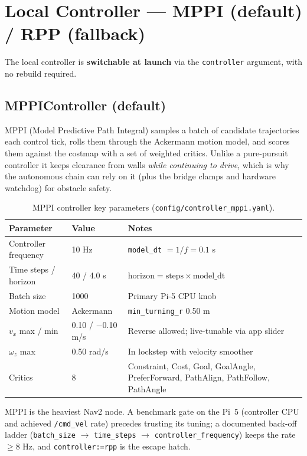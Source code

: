 \documentclass[12pt,a4paper]{report}
\begin{document}
\section{Local Controller --- MPPI (default) / RPP (fallback)}

The local controller is \textbf{switchable at launch} via the \texttt{controller}
argument, with no rebuild required.

\subsection{MPPIController (default)}

MPPI (Model Predictive Path Integral) samples a batch of candidate trajectories
each control tick, rolls them through the Ackermann motion model, and scores them
against the costmap with a set of weighted critics. Unlike a pure-pursuit
controller it keeps clearance from walls \emph{while continuing to drive}, which
is why the autonomous chain can rely on it (plus the bridge clamps and hardware
watchdog) for obstacle safety.

\begin{table}[H]
\centering
\caption{MPPI controller key parameters (\texttt{config/controller\_mppi.yaml}).}
\label{tab:mppi}
\begin{tabularx}{\textwidth}{|p{5.2cm}|p{2.6cm}|X|}
\hline
\textbf{Parameter} & \textbf{Value} & \textbf{Notes} \\
\hline
Controller frequency & 10 Hz & \texttt{model\_dt} $= 1/f = 0.1$ s \\
\hline
Time steps / horizon & 40 / 4.0 s & $\text{horizon} = \text{steps}\times\text{model\_dt}$ \\
\hline
Batch size & 1000 & Primary Pi-5 CPU knob \\
\hline
Motion model & Ackermann & \texttt{min\_turning\_r} 0.50 m \\
\hline
$v_x$ max / min & 0.10 / $-$0.10 m/s & Reverse allowed; live-tunable via app slider \\
\hline
$\omega_z$ max & 0.50 rad/s & In lockstep with velocity smoother \\
\hline
Critics & 8 & Constraint, Cost, Goal, GoalAngle, PreferForward, PathAlign, PathFollow, PathAngle \\
\hline
\end{tabularx}
\end{table}

MPPI is the heaviest Nav2 node. A benchmark gate on the Pi~5 (controller CPU and
achieved \texttt{/cmd\_vel} rate) precedes trusting its tuning; a documented
back-off ladder (\texttt{batch\_size} $\rightarrow$ \texttt{time\_steps}
$\rightarrow$ \texttt{controller\_frequency}) keeps the rate $\geq 8$ Hz, and
\texttt{controller:=rpp} is the escape hatch.
\end{document}
